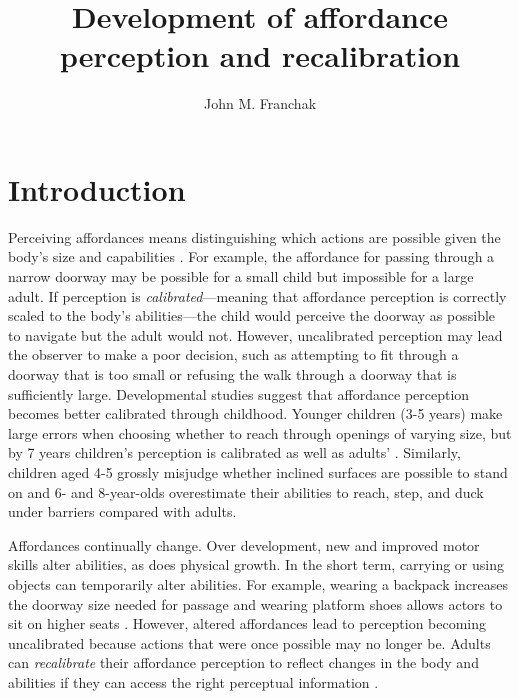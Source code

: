 \documentclass[a4paper,man,natbib,floatsintext,noextraspace]{apa6}
\title{Development of affordance perception and recalibration}
\author{John M. Franchak}
\affiliation{University of California, Riverside}
\begin{document}
\maketitle

\section{Introduction}

Perceiving affordances means distinguishing which actions are possible given the body's size and capabilities \citep{Gibson79}. For example, the affordance for passing through a narrow doorway may be possible for a small child but impossible for a large adult. If perception is \textit{calibrated}---meaning that affordance perception is correctly scaled to the body's abilities---the child would perceive the doorway as possible to navigate but the adult would not. However, uncalibrated perception may lead the observer to make a poor decision, such as attempting to fit through a doorway that is too small or refusing the walk through a doorway that is sufficiently large. Developmental studies suggest that affordance perception becomes better calibrated through childhood. Younger children (3-5 years) make large errors when choosing whether to reach through openings of varying size, but by 7 years children’s perception is calibrated as well as adults' \citep{ChildReaching}. Similarly, children aged 4-5 grossly misjudge whether inclined surfaces are possible to stand on \citep{KlevbergAnderson} and 6- and 8-year-olds overestimate their abilities to reach, step, and duck under barriers \citep{Plumert95} compared with adults.

Affordances continually change. Over development, new and improved motor skills alter abilities, as does physical growth. In the short term, carrying or using objects can temporarily alter abilities. For example, wearing a backpack increases the doorway size needed for passage  and wearing platform shoes allows actors to sit on higher seats \citep{Mark87}. However, altered affordances lead to perception becoming uncalibrated because actions that were once possible may no longer be. Adults can \textit{recalibrate} their affordance perception to reflect changes in the body and abilities if they can access the right perceptual information \citep{Recal,DoorwayLearning,Mark87,MarkSitting90}. 
\end{document}
